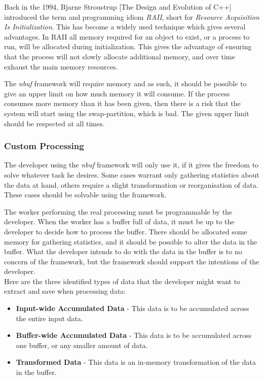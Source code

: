 \documentclass[a4paper]{article}
\newcommand{\nbuf}{\textit{nbuf} }
\begin{document}
Back in the 1994, Bjarne Stroustrup [The Design and Evolution of C++] introduced the term and programming idiom \textit{RAII}, short for \textit{Resource Acquisition Is Initialization}. This has become a widely used technique which gives several advantages. In RAII all memory required for an object to exist, or a process to run, will be allocated during initialization. This gives the advantage of ensuring that the process will not slowly allocate additional memory, and over time exhaust the main memory resources.

The \nbuf framework will require memory and as such, it should be possible to give an upper limit on how much memory it will consume. If the process consumes more memory than it has been given, then there is a risk that the system will start using the swap-partition, which is bad. The given upper limit should be respected at all times.


\subsubsection{Custom Processing}
The developer using the \nbuf framework will only use it, if it gives the freedom to solve whatever task he desires. Some cases warrant only gathering statistics about the data at hand, others require a slight transformation or reorganisation of data. These cases should be solvable using the framework. 

The worker performing the real processing must be programmable by the developer. When the worker has a buffer full of data, it must be up to the developer to decide how to process the buffer. There should be allocated some memory for gathering statistics, and it should be possible to alter the data in the buffer. What the developer intends to do with the data in the buffer is to no concern of the framework, but the framework should support the intentions of the developer.\\

Here are the three identified types of data that the developer might want to extract and save when processing data:
\begin{itemize}
\item \textbf{Input-wide Accumulated Data} - This data is to be accumulated across the entire input data.
\item \textbf{Buffer-wide Accumulated Data} - This data is to be accumulated across one buffer, or any smaller amount of data.
\item \textbf{Transformed Data} - This data is an in-memory transformation of the data in the buffer.
\end{itemize}
\end{document}
